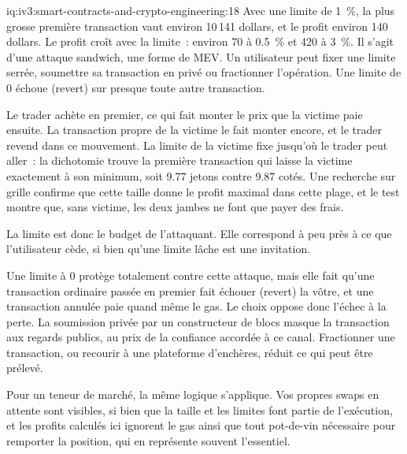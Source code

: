 \begin{solution}{iq:iv3:smart-contracts-and-crypto-engineering:18}
Avec une limite de 1~\%, la plus grosse première transaction vaut environ 10\,141 dollars, et le profit environ 140 dollars. Le profit croît avec la limite~: environ 70 à 0.5~\% et 420 à 3~\%. Il s'agit d'une attaque sandwich, une forme de MEV. Un utilisateur peut fixer une limite serrée, soumettre sa transaction en privé ou fractionner l'opération. Une limite de 0 échoue (revert) sur presque toute autre transaction.
\label{lst:iv3:cr:sandwich}

Le trader achète en premier, ce qui fait monter le prix que la victime paie ensuite. La transaction propre de la victime le fait monter encore, et le trader revend dans ce mouvement. La limite de la victime fixe jusqu'où le trader peut aller~: la dichotomie trouve la première transaction qui laisse la victime exactement à son minimum, soit 9.77 jetons contre 9.87 cotés. Une recherche sur grille confirme que cette taille donne le profit maximal dans cette plage, et le test montre que, sans victime, les deux jambes ne font que payer des frais.

La limite est donc le budget de l'attaquant. Elle correspond à peu près à ce que l'utilisateur cède, si bien qu'une limite lâche est une invitation.

Une limite à 0 protège totalement contre cette attaque, mais elle fait qu'une transaction ordinaire passée en premier fait échouer (revert) la vôtre, et une transaction annulée paie quand même le gas. Le choix oppose donc l'échec à la perte. La soumission privée par un constructeur de blocs masque la transaction aux regards publics, au prix de la confiance accordée à ce canal. Fractionner une transaction, ou recourir à une plateforme d'enchères, réduit ce qui peut être prélevé.

Pour un teneur de marché, la même logique s'applique. Vos propres swaps en attente sont visibles, si bien que la taille et les limites font partie de l'exécution, et les profits calculés ici ignorent le gas ainsi que tout pot-de-vin nécessaire pour remporter la position, qui en représente souvent l'essentiel.

\end{solution}

